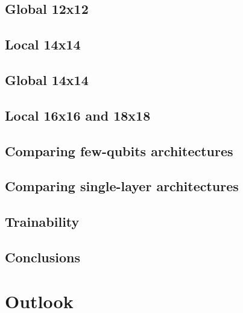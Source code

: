 \subsection{Global 12x12}


\subsection{Local 14x14}


\subsection{Global 14x14}


\subsection{Local 16x16 and 18x18}


\subsection{Comparing few-qubits architectures}


\subsection{Comparing single-layer architectures}


\subsection{Trainability}


\subsection{Conclusions}

\section{Outlook}



